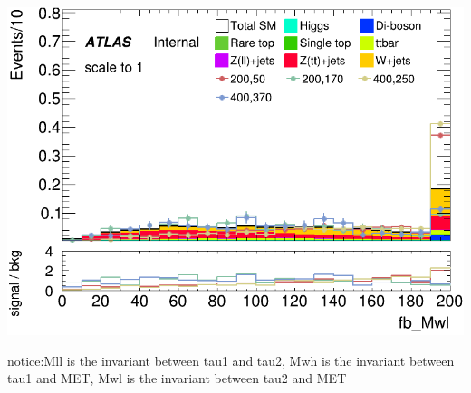 \documentclass[usenames,dvipsnames]{beamer}
\begin{document}
\begin{frame}
\begin{minipage}{0.32\textwidth}
        \centering
        \includegraphics[width=\textwidth]{graphics/HH_met_sig/HH_fb_Mwl_norm.png}
    \end{minipage}	
notice:Mll is the invariant between tau1 and tau2, Mwh is the invariant between tau1 and MET, Mwl is the invariant between tau2 and MET  
\end{frame}
\end{document}
